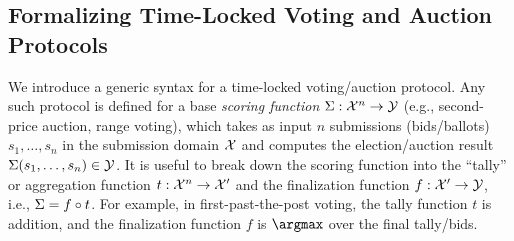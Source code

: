 \subsection{Formalizing Time-Locked Voting and Auction Protocols}\label{sec:syntax}

We introduce a generic syntax for a time-locked voting/auction protocol. Any such protocol is defined for a base \emph{scoring function} $\Sigma: \mathcal{X}^n \to \mathcal{Y}$ (e.g., second-price auction, range voting), which takes as input $n$ submissions (bids/ballots) $s_1, \dots, s_n$ in the submission domain $\mathcal{X}$ and computes the election/auction result $\Sigma(s_1, \dots, s_n) \in \mathcal{Y}$. It is useful to break down the scoring function into the ``tally'' or aggregation function $t: \mathcal{X}^n \to \mathcal{X}'$ and the finalization function $f: \mathcal{X}' \to \mathcal{Y}$, i.e., $\Sigma = f \circ t$.
For example, in first-past-the-post voting, the tally function $t$ is addition, and the finalization function $f$ is $\argmax$ over the final tally/bids.


